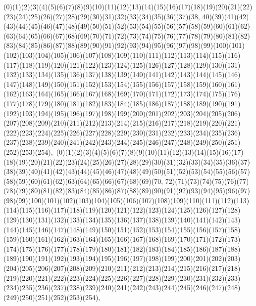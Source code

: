 \documentclass[12pt]{article}
\begin{document}
{(0)(1)(2)(3)(4)(5)(6)(7)(8)(9)(10)(11)(12)(13)(14)(15)(16)(17)(18)(19)(20)(21)(22)(23)(24)(25)(26)(27)(28)(29)(30)(31)(32)(33)(34)(35)(36)(37)(38, 40)(39)(41)(42)(43)(44)(45)(46)(47)(48)(49)(50)(51)(52)(53)(54)(55)(56)(57)(58)(59)(60)(61)(62)(63)(64)(65)(66)(67)(68)(69)(70)(71)(72)(73)(74)(75)(76)(77)(78)(79)(80)(81)(82)(83)(84)(85)(86)(87)(88)(89)(90)(91)(92)(93)(94)(95)(96)(97)(98)(99)(100)(101)(102)(103)(104)(105)(106)(107)(108)(109)(110)(111)(112)(113)(114)(115)(116)(117)(118)(119)(120)(121)(122)(123)(124)(125)(126)(127)(128)(129)(130)(131)(132)(133)(134)(135)(136)(137)(138)(139)(140)(141)(142)(143)(144)(145)(146)(147)(148)(149)(150)(151)(152)(153)(154)(155)(156)(157)(158)(159)(160)(161)(162)(163)(164)(165)(166)(167)(168)(169)(170)(171)(172)(173)(174)(175)(176)(177)(178)(179)(180)(181)(182)(183)(184)(185)(186)(187)(188)(189)(190)(191)(192)(193)(194)(195)(196)(197)(198)(199)(200)(201)(202)(203)(204)(205)(206)(207)(208)(209)(210)(211)(212)(213)(214)(215)(216)(217)(218)(219)(220)(221)(222)(223)(224)(225)(226)(227)(228)(229)(230)(231)(232)(233)(234)(235)(236)(237)(238)(239)(240)(241)(242)(243)(244)(245)(246)(247)(248)(249)(250)(251)(252)(253)(254)$
, 
$
(0)(1)(2)(3)(4)(5)(6)(7)(8)(9)(10)(11)(12)(13)(14)(15)(16)(17)(18)(19)(20)(21)(22)(23)(24)(25)(26)(27)(28)(29)(30)(31)(32)(33)(34)(35)(36)(37)(38)(39)(40)(41)(42)(43)(44)(45)(46)(47)(48)(49)(50)(51)(52)(53)(54)(55)(56)(57)(58)(59)(60)(61)(62)(63)(64)(65)(66)(67)(68)(69)(70, 72)(71)(73)(74)(75)(76)(77)(78)(79)(80)(81)(82)(83)(84)(85)(86)(87)(88)(89)(90)(91)(92)(93)(94)(95)(96)(97)(98)(99)(100)(101)(102)(103)(104)(105)(106)(107)(108)(109)(110)(111)(112)(113)(114)(115)(116)(117)(118)(119)(120)(121)(122)(123)(124)(125)(126)(127)(128)(129)(130)(131)(132)(133)(134)(135)(136)(137)(138)(139)(140)(141)(142)(143)(144)(145)(146)(147)(148)(149)(150)(151)(152)(153)(154)(155)(156)(157)(158)(159)(160)(161)(162)(163)(164)(165)(166)(167)(168)(169)(170)(171)(172)(173)(174)(175)(176)(177)(178)(179)(180)(181)(182)(183)(184)(185)(186)(187)(188)(189)(190)(191)(192)(193)(194)(195)(196)(197)(198)(199)(200)(201)(202)(203)(204)(205)(206)(207)(208)(209)(210)(211)(212)(213)(214)(215)(216)(217)(218)(219)(220)(221)(222)(223)(224)(225)(226)(227)(228)(229)(230)(231)(232)(233)(234)(235)(236)(237)(238)(239)(240)(241)(242)(243)(244)(245)(246)(247)(248)(249)(250)(251)(252)(253)(254)$
, 
$
}
\end{document}
